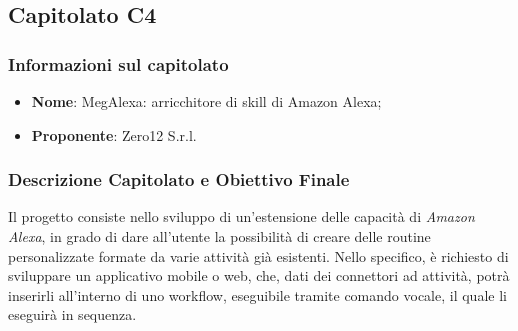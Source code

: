 \subsection{Capitolato C4}\label{C4}

\subsubsection{Informazioni sul capitolato}
\begin{itemize}
	\item \textbf{Nome}: MegAlexa: arricchitore di skill di Amazon Alexa;
	\item \textbf{Proponente}: Zero12 S.r.l.
\end{itemize}

\subsubsection{Descrizione Capitolato e Obiettivo Finale}
Il progetto consiste nello sviluppo di un'estensione delle capacità di \textit{Amazon Alexa}\glossario, in grado di dare all'utente la possibilità di creare delle routine personalizzate formate da varie attività già esistenti.
Nello specifico, è richiesto di sviluppare un applicativo mobile o web, che, dati dei connettori ad attività, potrà inserirli all'interno di uno workflow, eseguibile tramite comando vocale, il quale li eseguirà in sequenza.

